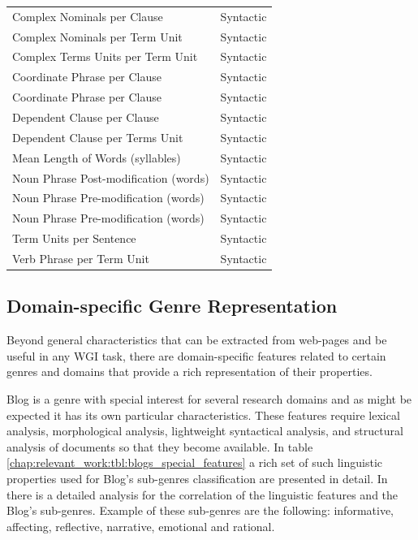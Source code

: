 \begin{table}[t]
\begin{tabular}{ll}
		Complex Nominals per Clause & Syntactic \\
		Complex Nominals per Term Unit & Syntactic \\
		Complex Terms Units per Term Unit & Syntactic \\
		Coordinate Phrase per Clause & Syntactic \\
		Coordinate Phrase per Clause & Syntactic \\
		Dependent Clause per Clause & Syntactic \\
		Dependent Clause per Terms Unit & Syntactic \\
		Mean Length of Words (syllables) & Syntactic \\
		Noun Phrase Post-modification (words) & Syntactic \\
		Noun Phrase Pre-modification (words) & Syntactic \\
		Noun Phrase Pre-modification (words) & Syntactic \\
		Term Units per Sentence & Syntactic \\
		Verb Phrase per Term Unit & Syntactic \\
		\hline
	\end{tabular}
\end{table}

\subsection{Domain-specific Genre Representation}

Beyond general characteristics that can be extracted from web-pages and be useful in any WGI task, there are domain-specific features related to certain genres and domains that provide a rich representation of their properties.

Blog is a genre with special interest for several research domains and as might be expected it has its own particular characteristics. These features require lexical analysis, morphological analysis, lightweight syntactical analysis, and structural analysis of documents so that they become available. In table \ref{chap:relevant_work:tbl:blogs_special_features} a rich set of such linguistic properties used for Blog's sub-genres classification are presented in detail. In \parencite{virik2017blog} there is a detailed analysis for the correlation of the linguistic features and the Blog's sub-genres. Example of these sub-genres are the following: informative, affecting, reflective, narrative, emotional and rational.

